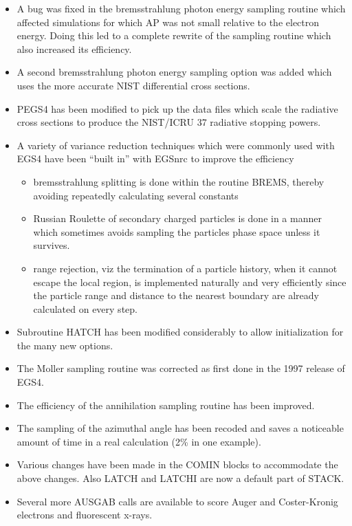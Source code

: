 \begin{itemize}
\item A bug was fixed in the bremsstrahlung photon energy sampling routine
which affected simulations for which AP was not small relative to the electron
energy.  Doing this led to a complete rewrite of the sampling routine which
also increased its efficiency.

\item A second bremsstrahlung photon energy sampling option was added which
uses the more accurate NIST differential cross sections.

\item PEGS4 has been modified to pick up the data files which scale the
radiative cross sections to produce the NIST/ICRU 37 radiative stopping
powers.

\item A variety of variance reduction techniques which were commonly used
with EGS4 have been ``built in'' with EGSnrc to improve the efficiency
   \begin{itemize}
   \item bremsstrahlung splitting is done within the routine BREMS, thereby
         avoiding repeatedly calculating several constants
   \item Russian Roulette of secondary charged particles is done in a
         manner which sometimes avoids sampling the particles phase space unless
         it survives.
   \item range rejection, viz the termination of a particle history, when
         it cannot escape the local region, is implemented naturally and
         very efficiently since the particle range and distance to the
	 nearest boundary are already calculated on every step.
   \end{itemize}

\item Subroutine HATCH has been modified considerably to allow
initialization for the many new options.

\item The Moller sampling routine was corrected as first done in the
1997 release of EGS4.


\item The efficiency of the annihilation sampling routine has been
improved.

\item The sampling of the azimuthal angle has been recoded and saves a
noticeable amount of time in a real calculation (2\% in one example).

\item Various changes have been made in the COMIN blocks to accommodate the
above changes. Also LATCH and LATCHI are  now a default part of STACK.

\item Several more AUSGAB calls are available to score Auger
and Coster-Kronig electrons and fluorescent x-rays.

\end{itemize}



